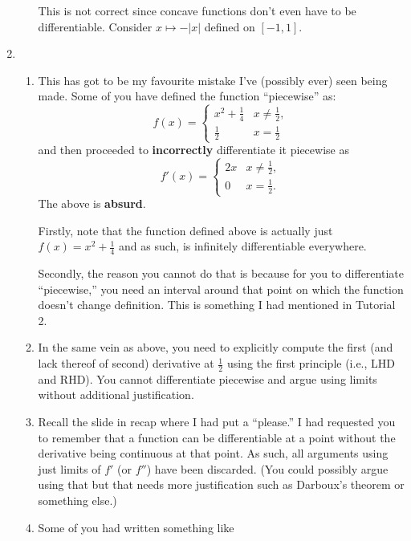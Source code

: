 \documentclass[12pt]{article}
\theoremstyle{definition}
\newenvironment{blockquote}
{\begin{mdframed}[skipabove=0pt, skipbelow=0pt, innertopmargin=4pt, innerbottommargin=4pt, bottomline=false,topline=false,rightline=false, linewidth=2pt]}
{\end{mdframed}}
\begin{document}
\begin{enumerate}[leftmargin=*, label = Q\arabic*.]
\begin{enumerate}[leftmargin=*, label = \roman*.]
		This is not correct since concave functions don't even have to be differentiable. Consider $x \mapsto -|x|$ defined on $[-1, 1].$
	\end{enumerate}
	\item \phantom{hi}
	\begin{enumerate}[leftmargin=*, label = \roman*.]
		\item This has got to be my favourite mistake I've (possibly ever) seen being made. Some of you have defined the function ``piecewise'' as:
		\begin{equation*} 
			f(x) = \begin{cases}
				x^2 + \frac{1}{4} & x \neq \frac{1}{2},\\
				\frac{1}{2} & x = \frac{1}{2}
			\end{cases}
		\end{equation*}
		and then proceeded to \textbf{{\color{red}incorrectly}} differentiate it piecewise as
		\begin{equation*} 
			f'(x) = \begin{cases}
				2x & x \neq \frac{1}{2},\\
				0 & x = \frac{1}{2}.
			\end{cases}
		\end{equation*}
		The above is \textbf{absurd}.

		Firstly, note that the function defined above is actually just $f(x) = x^2 + \frac{1}{4}$ and as such, is infinitely differentiable everywhere.

		Secondly, the reason you cannot do that is because for you to differentiate ``piecewise,'' you need an interval around that point on which the function doesn't change definition. This is something I had mentioned in Tutorial 2.
		\item In the same vein as above, you need to explicitly compute the first (and lack thereof of second) derivative at $\frac{1}{2}$ using the first principle (i.e., LHD and RHD). You cannot differentiate piecewise and argue using limits without additional justification.
		\item Recall the slide in recap where I had put a ``please.'' I had requested you to remember that a function can be differentiable at a point without the derivative being continuous at that point. As such, all arguments using just limits of $f'$ (or $f''$) have been discarded. (You could possibly argue using that but that needs more justification such as Darboux's theorem or something else.)
		\item Some of you had written something like \\
		\begin{blockquote}
		

\end{blockquote}
\end{enumerate}
\end{enumerate}
\end{document}
